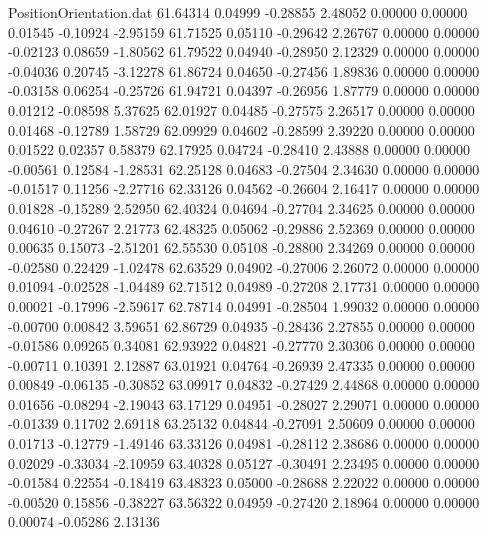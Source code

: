 \begin{filecontents}{PositionOrientation.dat}
  61.64314    0.04999   -0.28855     2.48052    0.00000    0.00000    0.01545   -0.10924   -2.95159
  61.71525    0.05110   -0.29642     2.26767    0.00000    0.00000   -0.02123    0.08659   -1.80562
  61.79522    0.04940   -0.28950     2.12329    0.00000    0.00000   -0.04036    0.20745   -3.12278
  61.86724    0.04650   -0.27456     1.89836    0.00000    0.00000   -0.03158    0.06254   -0.25726
  61.94721    0.04397   -0.26956     1.87779    0.00000    0.00000    0.01212   -0.08598    5.37625
  62.01927    0.04485   -0.27575     2.26517    0.00000    0.00000    0.01468   -0.12789    1.58729
  62.09929    0.04602   -0.28599     2.39220    0.00000    0.00000    0.01522    0.02357    0.58379
  62.17925    0.04724   -0.28410     2.43888    0.00000    0.00000   -0.00561    0.12584   -1.28531
  62.25128    0.04683   -0.27504     2.34630    0.00000    0.00000   -0.01517    0.11256   -2.27716
  62.33126    0.04562   -0.26604     2.16417    0.00000    0.00000    0.01828   -0.15289    2.52950
  62.40324    0.04694   -0.27704     2.34625    0.00000    0.00000    0.04610   -0.27267    2.21773
  62.48325    0.05062   -0.29886     2.52369    0.00000    0.00000    0.00635    0.15073   -2.51201
  62.55530    0.05108   -0.28800     2.34269    0.00000    0.00000   -0.02580    0.22429   -1.02478
  62.63529    0.04902   -0.27006     2.26072    0.00000    0.00000    0.01094   -0.02528   -1.04489
  62.71512    0.04989   -0.27208     2.17731    0.00000    0.00000    0.00021   -0.17996   -2.59617
  62.78714    0.04991   -0.28504     1.99032    0.00000    0.00000   -0.00700    0.00842    3.59651
  62.86729    0.04935   -0.28436     2.27855    0.00000    0.00000   -0.01586    0.09265    0.34081
  62.93922    0.04821   -0.27770     2.30306    0.00000    0.00000   -0.00711    0.10391    2.12887
  63.01921    0.04764   -0.26939     2.47335    0.00000    0.00000    0.00849   -0.06135   -0.30852
  63.09917    0.04832   -0.27429     2.44868    0.00000    0.00000    0.01656   -0.08294   -2.19043
  63.17129    0.04951   -0.28027     2.29071    0.00000    0.00000   -0.01339    0.11702    2.69118
  63.25132    0.04844   -0.27091     2.50609    0.00000    0.00000    0.01713   -0.12779   -1.49146
  63.33126    0.04981   -0.28112     2.38686    0.00000    0.00000    0.02029   -0.33034   -2.10959
  63.40328    0.05127   -0.30491     2.23495    0.00000    0.00000   -0.01584    0.22554   -0.18419
  63.48323    0.05000   -0.28688     2.22022    0.00000    0.00000   -0.00520    0.15856   -0.38227
  63.56322    0.04959   -0.27420     2.18964    0.00000    0.00000    0.00074   -0.05286    2.13136

\end{filecontents}
